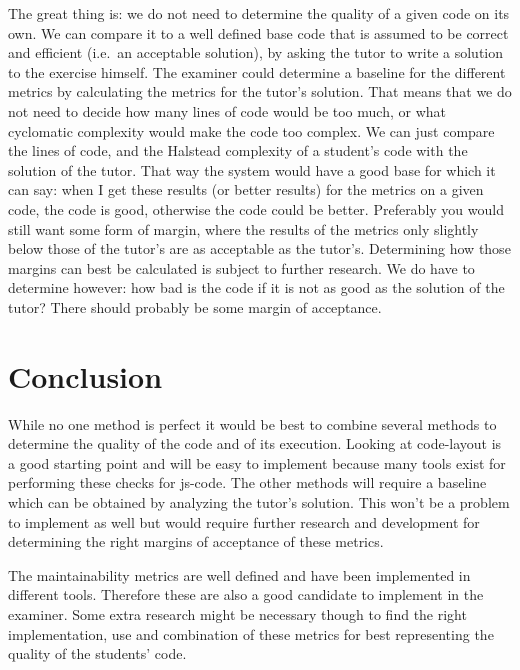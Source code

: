 The great thing is:
we do not need to determine the quality of a given \gls{code} on its own.
We can compare it to a well defined base \gls{code}
that is assumed to be correct and efficient (i.e.\ an acceptable solution),
by asking the \gls{tutor} to write a \gls{solution}
to the \gls{exercise} himself.
The \gls{examiner} could determine a baseline for the different metrics
by calculating the metrics for the \gls{tutor}'s \gls{solution}.
That means that we do not need to decide
how many lines of code would be too much,
or what cyclomatic complexity would make the \gls{code} too complex.
We can just compare the lines of code,
and the Halstead complexity of a \gls{student}'s \gls{code}
with the \gls{solution} of the \gls{tutor}.
That way the system would have a good base for which it can say:
when I get these results (or better results)
for the metrics on a given \gls{code}, the \gls{code} is good,
otherwise the \gls{code} could be better.
Preferably you would still want some form of margin,
where the results of the metrics only slightly below those of the \gls{tutor}'s
are as acceptable as the \gls{tutor}'s.
Determining how those margins can best be calculated
is subject to further research.
We do have to determine however: how bad is the \gls{code}
if it is not as good as the solution of the \gls{tutor}?
There should probably be some margin of acceptance.


\section{Conclusion}

While no one method is perfect it would be best to combine several methods
to determine the quality of the code and of its execution.
Looking at \gls{code-layout} is a good starting point
and will be easy to implement because many tools exist
for performing these checks for \gls{js-code}.
The other methods will require a baseline
which can be obtained by analyzing the \gls{tutor}'s \gls{solution}.
This won't be a problem to implement as well
but would require further research and development
for determining the right margins of acceptance of these metrics.

The maintainability metrics are well defined
and have been implemented in different tools.
Therefore these are also a good candidate to implement in the \gls{examiner}.
Some extra research might be necessary though
to find the right implementation, use and combination of these metrics
for best representing the quality of the \glspl{student}' \gls{code}.

